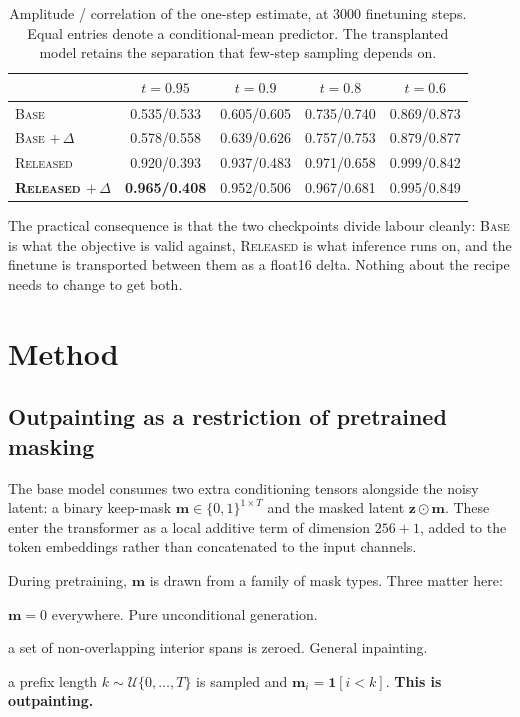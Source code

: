 \documentclass[10pt,twocolumn,letterpaper]{article}
\newcommand{\bz}{\mathbf{z}}
\newcommand{\bm}{\mathbf{m}}
\begin{document}
\begin{table}[t]
\centering
\small
\begin{tabular}{lcccc}
\toprule
& $t{=}0.95$ & $t{=}0.9$ & $t{=}0.8$ & $t{=}0.6$ \\
\midrule
\textsc{Base}              & 0.535/0.533 & 0.605/0.605 & 0.735/0.740 & 0.869/0.873 \\
\textsc{Base} $+\,\Delta$  & 0.578/0.558 & 0.639/0.626 & 0.757/0.753 & 0.879/0.877 \\
\textsc{Released}          & 0.920/0.393 & 0.937/0.483 & 0.971/0.658 & 0.999/0.842 \\
\textbf{\textsc{Released} $+\,\Delta$} & \textbf{0.965/0.408} & 0.952/0.506 & 0.967/0.681 & 0.995/0.849 \\
\bottomrule
\end{tabular}
\caption{Amplitude / correlation of the one-step estimate, at 3000 finetuning
steps. Equal entries denote a conditional-mean predictor. The transplanted model
retains the separation that few-step sampling depends on.}
\label{tab:transplant}
\end{table}

The practical consequence is that the two checkpoints divide labour cleanly:
\textsc{Base} is what the objective is valid against, \textsc{Released} is what
inference runs on, and the finetune is transported between them as a float16
delta. Nothing about the recipe needs to change to get both.

\section{Method}

\subsection{Outpainting as a restriction of pretrained masking}
\label{sec:mask}

The base model consumes two extra conditioning tensors alongside the noisy latent: a
binary keep-mask $\bm \in \{0,1\}^{1 \times T}$ and the masked latent $\bz \odot \bm$.
These enter the transformer as a local additive term of dimension $256{+}1$, added to the
token embeddings rather than concatenated to the input channels.

During pretraining, $\bm$ is drawn from a family of mask types. Three matter here:

\begin{description}\itemsep2pt
\item[\textsc{Full}] $\bm = 0$ everywhere. Pure unconditional generation.
\item[\textsc{Spans}] a set of non-overlapping interior spans is zeroed. General inpainting.
\item[\textsc{Causal}] a prefix length $k \sim \mathcal{U}\{0,\dots,T\}$ is sampled and
$\bm_{i} = \mathbf{1}[i < k]$. \textbf{This is outpainting.}
\end{description}
\end{document}
